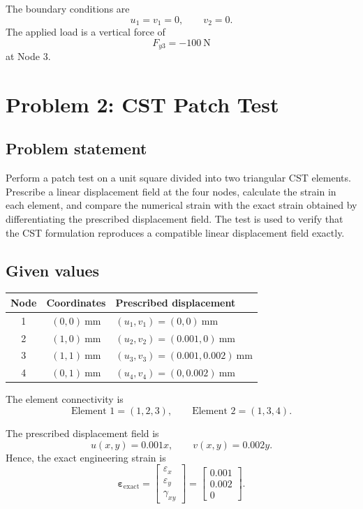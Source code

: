 \documentclass[12pt,a4paper]{article}
\begin{document}
The boundary conditions are
\[
u_1=v_1=0,\qquad v_2=0.
\]
The applied load is a vertical force of
\[
F_{y3}=-\SI{100}{\newton}
\]
at Node 3.

\section{Problem 2: CST Patch Test}

\subsection*{Problem statement}

Perform a patch test on a unit square divided into two triangular CST
elements. Prescribe a linear displacement field at the four nodes, calculate
the strain in each element, and compare the numerical strain with the exact
strain obtained by differentiating the prescribed displacement field. The
test is used to verify that the CST formulation reproduces a compatible
linear displacement field exactly.

\subsection*{Given values}

\begin{table}[h!]
\centering
\begin{tabular}{ccl}
\toprule
\textbf{Node} & \textbf{Coordinates} & \textbf{Prescribed displacement} \\
\midrule
1 & $(0,0)\ \si{\milli\metre}$ & $(u_1,v_1)=(0,0)\ \si{\milli\metre}$ \\
2 & $(1,0)\ \si{\milli\metre}$ & $(u_2,v_2)=(0.001,0)\ \si{\milli\metre}$ \\
3 & $(1,1)\ \si{\milli\metre}$ & $(u_3,v_3)=(0.001,0.002)\ \si{\milli\metre}$ \\
4 & $(0,1)\ \si{\milli\metre}$ & $(u_4,v_4)=(0,0.002)\ \si{\milli\metre}$ \\
\bottomrule
\end{tabular}
\end{table}

The element connectivity is
\[
\text{Element 1}=(1,2,3),\qquad
\text{Element 2}=(1,3,4).
\]

The prescribed displacement field is
\[
u(x,y)=0.001x,\qquad v(x,y)=0.002y.
\]
Hence, the exact engineering strain is
\[
\boldsymbol{\varepsilon}_{\mathrm{exact}}
 =
\begin{bmatrix}
\varepsilon_x\\
\varepsilon_y\\
\gamma_{xy}
\end{bmatrix}
 =
\begin{bmatrix}
0.001\\
0.002\\
0
\end{bmatrix}.
\]
\end{document}
